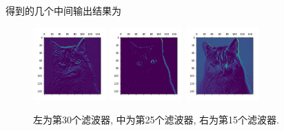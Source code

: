 \documentclass[lang=cn,11pt]{elegantpaper}
\begin{document}
\noindent 得到的几个中间输出结果为
\begin{figure}[h]
\centering
  \includegraphics[width=0.25\textwidth]{30.png}
  \includegraphics[width=0.25\textwidth]{25}
  \includegraphics[width=0.25\textwidth]{15}
  \caption{左为第30个滤波器, 中为第25个滤波器, 右为第15个滤波器.}
\end{figure}
\end{document}
